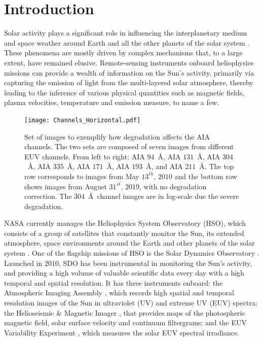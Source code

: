 \documentclass{aa}
\begin{document}
 \maketitle


\section{Introduction}
\label{Section:intro}
Solar activity plays a significant role in influencing the interplanetary medium and space weather around Earth and all the other planets of the solar system \citep{Schwenn2006}. These phenomena are mostly driven by complex mechanisms that, to a large extent, have remained elusive. 
Remote-sensing instruments onboard heliophysics missions can provide a wealth of information on the Sun’s activity, primarily via capturing the emission of light from the multi-layered solar atmosphere, thereby leading to the inference of various physical quantities such as magnetic fields, plasma velocities, temperature and emission measure, to name a few.

\begin{figure}
    \texttt{[image: Channels\_Horizontal.pdf]}
    \caption{Set of images to exemplify how degradation affects the AIA channels. The two sets are composed of seven images from different EUV channels. From left to right: AIA $94$~\AA, AIA $131$~\AA, AIA $304$~\AA, AIA $335$~\AA, AIA $171$~\AA, AIA $193$~\AA, and AIA $211$~\AA. The top row corresponds to images from May $13^{th}$, $2010$ and the bottom row shows images from August $31^{st}$, $2019$, with no degradation correction. The $304$~\AA~channel images are in log-scale due the severe degradation.}
    \label{fig:autocalibrate_model_problem}
\end{figure}

NASA currently manages the Heliophysics System Observatory (HSO), which consists of a group of satellites that constantly monitor the Sun, its extended atmosphere, space environments around the Earth and other planets of the solar system \citep{HSO}. One of the flagship missions of HSO is the Solar Dynamics Observatory \citep[SDO, ][]{SDO_primary}. Launched in $2010$, SDO has been instrumental in monitoring the Sun's activity, and providing a high volume of valuable scientific data every day with a high temporal and spatial resolution. It has three instruments onboard: the Atmospheric Imaging Assembly \citep[AIA,][]{AIA}, which records high spatial and temporal resolution images of the Sun in  ultraviolet (UV) and extreme UV (EUV) spectra; the Helioseismic \& Magnetic Imager \citep[HMI,][]{HMI}, that provides maps of the  photospheric magnetic field, solar surface velocity and continuum filtergrams; and the EUV Variability Experiment \citep[EVE,][]{EVE}, which measures the solar EUV spectral irradiance.
\end{document}
